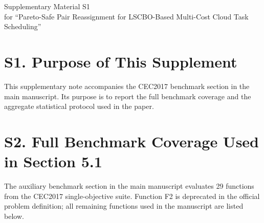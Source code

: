\documentclass[11pt]{article}
\begin{document}
\begin{center}
{\Large Supplementary Material S1}\\[4pt]
{\large for ``Pareto-Safe Pair Reassignment for LSCBO-Based Multi-Cost Cloud Task Scheduling''}
\end{center}

\section*{S1. Purpose of This Supplement}
This supplementary note accompanies the CEC2017 benchmark section in the main manuscript. Its purpose is to report the full benchmark coverage and the aggregate statistical protocol used in the paper.

\section*{S2. Full Benchmark Coverage Used in Section 5.1}
The auxiliary benchmark section in the main manuscript evaluates 29 functions from the CEC2017 single-objective suite. Function F2 is deprecated in the official problem definition; all remaining functions used in the manuscript are listed below.
\end{document}
